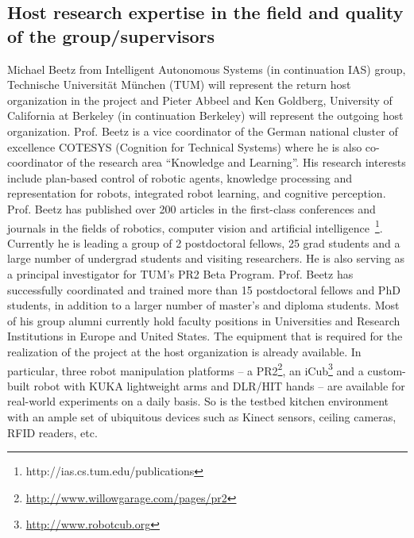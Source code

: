 \subsection{Host research expertise in the field and quality of the group/supervisors}
Michael Beetz from Intelligent Autonomous Systems (in continuation IAS) group, Technische Universit\"at 
M\"unchen (TUM) will represent the return host organization in the project and Pieter Abbeel and Ken
Goldberg, University of California at Berkeley (in continuation Berkeley) will represent
the outgoing host organization. 
Prof. Beetz is a vice coordinator of the German national cluster of excellence 
COTESYS (Cognition for Technical Systems) where he is also co-coordinator of the research area 
``Knowledge and Learning''. 
His research interests include plan-based control of 
robotic agents, knowledge processing and representation for robots, integrated robot learning, and cognitive perception.
Prof. Beetz has published over 200 articles in the first-class conferences and
journals in the fields of robotics, computer vision and artificial 
intelligence~\footnote{http://ias.cs.tum.edu/publications}.
Currently he is leading a group of 2 postdoctoral fellows, 25 grad students and a large number
of undergrad students and visiting researchers. He is also serving as a principal investigator 
for TUM's PR2 Beta Program. Prof. Beetz has successfully coordinated and trained 
more than 15 postdoctoral fellows and PhD students, in addition to a larger number of 
master's and diploma students. Most of his group alumni currently hold faculty positions in 
Universities and Research Institutions in Europe and United States.
The equipment that is required for the realization of the project at the host organization is already available. In
particular, three robot manipulation platforms -- a PR2\footnote{\url{http://www.willowgarage.com/pages/pr2}}, an
iCub\footnote{\url{http://www.robotcub.org}} and a custom-built robot
with KUKA lightweight arms and DLR/HIT hands -- are available for
real-world experiments on a daily basis. So is the testbed kitchen environment with an ample
set of ubiquitous devices such as Kinect sensors, ceiling cameras, RFID readers, etc.\\
